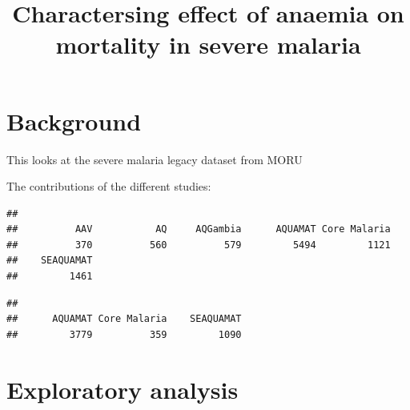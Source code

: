 \documentclass[]{article}
\title{Charactersing effect of anaemia on mortality in severe malaria}
\author{}
\date{}
\newenvironment{Shaded}{\begin{snugshade}}{\end{snugshade}}
\newcommand{\KeywordTok}[1]{\textcolor[rgb]{0.13,0.29,0.53}{\textbf{#1}}}
\newcommand{\CommentTok}[1]{\textcolor[rgb]{0.56,0.35,0.01}{\textit{#1}}}
\newcommand{\OperatorTok}[1]{\textcolor[rgb]{0.81,0.36,0.00}{\textbf{#1}}}
\newcommand{\NormalTok}[1]{#1}
\begin{document}
\maketitle

{
\setcounter{tocdepth}{2}
\tableofcontents
}
\section{Background}\label{background}

This looks at the severe malaria legacy dataset from MORU

The contributions of the different studies:

\begin{Shaded}
\end{Shaded}

\begin{verbatim}
## 
##          AAV           AQ     AQGambia      AQUAMAT Core Malaria 
##          370          560          579         5494         1121 
##    SEAQUAMAT 
##         1461
\end{verbatim}

\begin{Shaded}
\end{Shaded}

\begin{verbatim}
## 
##      AQUAMAT Core Malaria    SEAQUAMAT 
##         3779          359         1090
\end{verbatim}

\section{Exploratory analysis}\label{exploratory-analysis}
\end{document}

